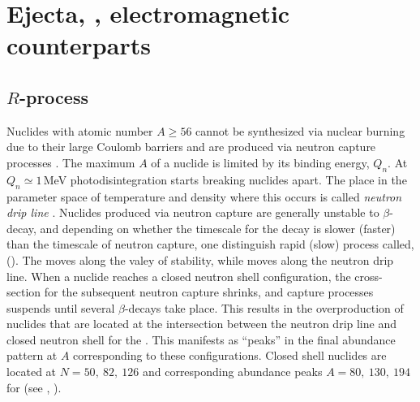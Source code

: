 
\section{Ejecta, \nuc{}, electromagnetic counterparts}

\subsection{$R$-process \nuc{}} \label{sec:intro:nucleo}

Nuclides with atomic number  $A\geq 56$ cannot be synthesized via nuclear burning 
due to their large Coulomb barriers and are produced via 
neutron capture processes \citep{Burbidge:1957}.
The maximum $A$ of a nuclide is limited by its binding energy, $Q_n$. 
At $Q_n \simeq1 \,$MeV photodisintegration starts breaking nuclides apart. 
The place in the parameter space of temperature and density where this occurs 
is called \textit{neutron drip line} \citep{Rolfs:1988}.
Nuclides produced via neutron capture are generally unstable to $\beta$-decay,
and depending on whether the timescale for the decay is slower (faster) than 
the timescale of neutron capture, one distinguish rapid (slow) process called,
\rproc{} (\sproc{}).
%
The \sproc{} moves along the valey of stability, while \rproc{} moves along the 
neutron drip line.
%
When a nuclide reaches a closed neutron shell configuration, the cross-section 
for the subsequent neutron capture shrinks, and capture processes suspends until 
several $\beta$-decays take place. This results in the overproduction of nuclides 
that are located at the intersection between the neutron drip line and closed 
neutron shell for the \rproc{}. This manifests as ``peaks'' in the final abundance 
pattern at $A$ corresponding to these configurations.
Closed shell nuclides are located at $N=50,\: 82, \: 126$ and 
corresponding abundance peaks $A=80,\:130,\:194$ for \rproc{} 
(see \eg, \citet{Arnould:2007gh}).

